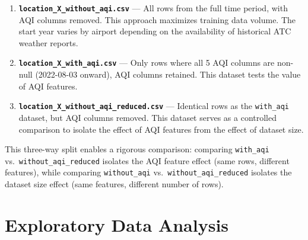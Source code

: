 \documentclass[
  letterpaper,
  DIV=11,
  numbers=noendperiod]{scrartcl}
\providecommand{\tightlist}{%
  \setlength{\itemsep}{0pt}\setlength{\parskip}{0pt}}
\begin{document}
\begin{enumerate}
\def\labelenumi{\arabic{enumi}.}
\tightlist
\item
  \textbf{\texttt{location\_X\_without\_aqi.csv}} --- All rows from the
  full time period, with AQI columns removed. This approach maximizes
  training data volume. The start year varies by airport depending on
  the availability of historical ATC weather reports.
\item
  \textbf{\texttt{location\_X\_with\_aqi.csv}} --- Only rows where all 5
  AQI columns are non-null (2022-08-03 onward), AQI columns retained.
  This dataset tests the value of AQI features.
\item
  \textbf{\texttt{location\_X\_without\_aqi\_reduced.csv}} --- Identical
  rows as the \texttt{with\_aqi} dataset, but AQI columns removed. This
  dataset serves as a controlled comparison to isolate the effect of AQI
  features from the effect of dataset size.
\end{enumerate}

This three-way split enables a rigorous comparison: comparing
\texttt{with\_aqi} vs.~\texttt{without\_aqi\_reduced} isolates the AQI
feature effect (same rows, different features), while comparing
\texttt{without\_aqi} vs.~\texttt{without\_aqi\_reduced} isolates the
dataset size effect (same features, different number of rows).

\section{Exploratory Data Analysis}\label{exploratory-data-analysis}
\end{document}
